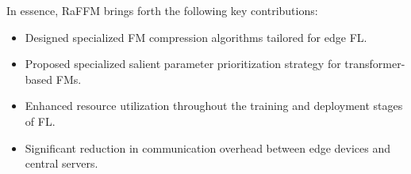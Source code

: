 In essence, RaFFM brings forth the following key contributions:
\begin{itemize}
    \item Designed specialized FM compression algorithms tailored for edge FL.
    \item Proposed specialized salient parameter prioritization strategy for transformer-based FMs.
    \item Enhanced resource utilization throughout the training and deployment stages of FL.
    \item Significant reduction in communication overhead between edge devices and central servers.
\end{itemize}





